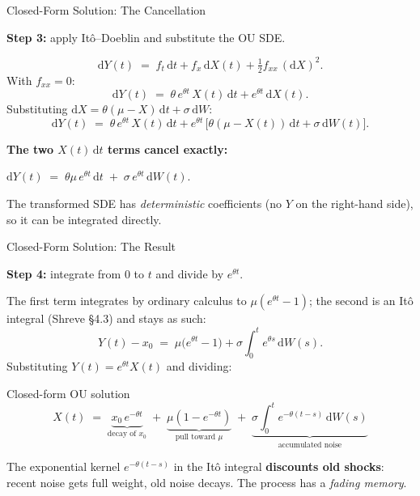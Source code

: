 \documentclass[10pt,aspectratio=169]{beamer}
\newcommand{\dd}{\mathrm{d}}
\begin{document}
\begin{frame}{Closed-Form Solution: The Cancellation}

\textbf{Step 3:} apply It\^o--Doeblin and substitute the OU SDE.

\medskip
\[
\dd Y(t) \;=\; f_t\,\dd t + f_x\,\dd X(t) + \tfrac{1}{2}f_{xx}\,(\dd X)^2.
\]
With $f_{xx}=0$:
\[
\dd Y(t) \;=\; \theta\,e^{\theta t}\,X(t)\,\dd t + e^{\theta t}\,\dd X(t).
\]
Substituting $\dd X = \theta(\mu - X)\,\dd t + \sigma\,\dd W$:
\[
\dd Y(t) \;=\; \theta\,e^{\theta t}\,X(t)\,\dd t + e^{\theta t}\,\bigl[\theta(\mu - X(t))\,\dd t + \sigma\,\dd W(t)\bigr].
\]

\medskip
\textbf{The two $X(t)\,\dd t$ terms cancel exactly:}
\begin{block}{}
\centering
$\dd Y(t) \;=\; \theta\mu\,e^{\theta t}\,\dd t \;+\; \sigma\,e^{\theta t}\,\dd W(t).$
\end{block}

\medskip
The transformed SDE has \emph{deterministic} coefficients (no $Y$ on the right-hand side),
so it can be integrated directly.

\end{frame}

\begin{frame}{Closed-Form Solution: The Result}

\textbf{Step 4:} integrate from $0$ to $t$ and divide by $e^{\theta t}$.

\medskip
The first term integrates by ordinary calculus to $\mu(e^{\theta t}-1)$;
the second is an It\^o integral (Shreve \S4.3) and stays as such:
\[
Y(t) - x_0 \;=\; \mu\bigl(e^{\theta t}-1\bigr) + \sigma\!\int_0^t e^{\theta s}\,\dd W(s).
\]
Substituting $Y(t) = e^{\theta t}X(t)$ and dividing:

\begin{block}{Closed-form OU solution}
\[
X(t) \;=\; \underbrace{x_0\,e^{-\theta t}}_{\text{decay of }x_0}
       \;+\; \underbrace{\mu(1 - e^{-\theta t})}_{\text{pull toward }\mu}
       \;+\; \underbrace{\sigma\!\int_0^t e^{-\theta(t-s)}\,\dd W(s)}_{\text{accumulated noise}}
\]
\end{block}

\medskip
The exponential kernel $e^{-\theta(t-s)}$ in the It\^o integral
\textbf{discounts old shocks}: recent noise gets full weight, old noise decays.
The process has a \emph{fading memory}.

\end{frame}
\end{document}
